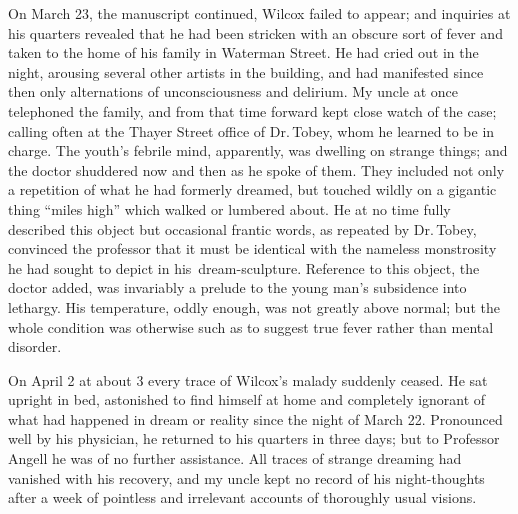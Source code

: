 On March 23, the manuscript continued, Wilcox failed to appear; and
inquiries at his quarters revealed that he had been stricken with an
obscure sort of fever and taken to the home of his family in Waterman
Street. He had cried out in the night, arousing several other artists in
the building, and had manifested since then only alternations of
unconsciousness and delirium. My uncle at once telephoned the family,
and from that time forward kept close watch of the case; calling often
at the Thayer Street office of Dr.\,Tobey, whom he learned to be in
charge. The youth's febrile mind, apparently, was dwelling on strange
things; and the doctor shuddered now and then as he spoke of them. They
included not only a repetition of what he had formerly dreamed, but
touched wildly on a gigantic thing ``miles high'' which walked or
lumbered about.
He at no time fully described this object but occasional frantic words,
as repeated by Dr.\,Tobey, convinced the professor that it must be
identical with the nameless monstrosity he had sought to depict in his\est\
dream-sculpture. Reference to this object, the doctor added, was
invariably a prelude to the young man's subsidence into lethargy. His
temperature, oddly enough, was not greatly above normal; but the whole
condition was otherwise such as to suggest true fever rather than mental
disorder.

On April 2 at about 3  every trace of Wilcox's malady suddenly
ceased. He sat upright in bed, astonished to find himself at home and
completely ignorant of what had happened in dream or reality since the
night of March 22. Pronounced well by his physician, he returned to his
quarters in three days; but to Professor Angell he was of no further
assistance. All traces of strange dreaming had vanished with his
recovery, and my uncle kept no record of his night-thoughts after a week
of pointless and irrelevant accounts of thoroughly usual visions.


